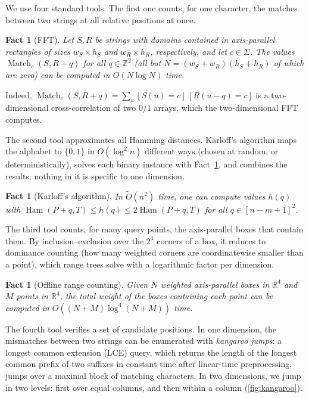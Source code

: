 \documentclass[11pt]{article}
\newtheorem{fact}[theorem]{Fact}
\theoremstyle{definition}
\newcommand{\Z}{\mathbb{Z}}
\newcommand{\R}{\mathbb{R}}
\newcommand{\tO}{\tilde{O}}
\renewcommand{\O}{O}
\DeclareMathOperator{\Ham}{Ham}
\DeclareMathOperator{\Match}{Match}
\begin{document}
We use four standard tools.
The first one counts, for one character, the matches between two strings at all relative positions at once.

\begin{fact}[FFT]\label{fact:fft}
Let $S, R$ be strings with domains contained in axis-parallel rectangles of sizes $w_S \times h_S$ and $w_R \times h_R$, respectively, and let $c \in \Sigma$.
The values $\Match_c(S, R + q)$ for all $q \in \Z^2$ (all but $N = (w_S + w_R)(h_S + h_R)$ of which are zero) can be computed in $\O(N \log N)$ time.
\end{fact}
Indeed, $\Match_c(S, R + q) = \sum_u [S(u) = c]\,[R(u-q) = c]$ is a two-dimensional cross-correlation of two $0/1$ arrays, which the two-dimensional FFT computes.

The second tool approximates all Hamming distances.
Karloff's algorithm maps the alphabet to $\{0,1\}$ in $\O(\log^2 n)$ different ways (chosen at random, or deterministically), solves each binary instance with Fact~\ref{fact:fft}, and combines the results; nothing in it is specific to one dimension.

\begin{fact}[Karloff's algorithm]\label{fact:karloff}
In $\tO(n^2)$ time, one can compute values $h(q)$ with $\Ham(P+q,T) \le h(q) \le 2\Ham(P+q,T)$ for all $q \in [n-m+1]^2$.
\end{fact}

The third tool counts, for many query points, the axis-parallel boxes that contain them.
By inclusion--exclusion over the $2^4$ corners of a box, it reduces to dominance counting (how many weighted corners are coordinatewise smaller than a point), which range trees solve with a logarithmic factor per dimension.

\begin{fact}[Offline range counting]\label{fact:range}
Given $N$ weighted axis-parallel boxes in $\R^4$ and $M$ points in $\R^4$, the total weight of the boxes containing each point can be computed in $\O((N + M)\log^4(N+M))$ time.
\end{fact}

The fourth tool verifies a set of candidate positions.
In one dimension, the mismatches between two strings can be enumerated with \emph{kangaroo jumps}: a longest common extension (LCE) query, which returns the length of the longest common prefix of two suffixes in constant time after linear-time preprocessing, jumps over a maximal block of matching characters.
In two dimensions, we jump in two levels: first over equal columns, and then within a column (\autoref{fig:kangaroo}).
\end{document}
